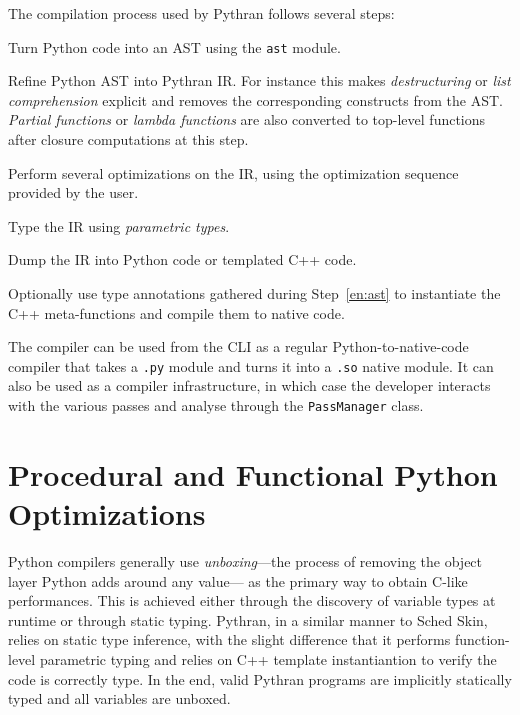\documentclass{llncs}
\begin{document}
The compilation process used by Pythran follows several steps:
\begin{inparaenum}[1)]
\item\label{en:ast} Turn Python code into an \ac{AST} using the \texttt{ast}
    module.
\item Refine Python \ac{AST} into Pythran \ac{IR}. For instance this makes
    \emph{destructuring} or \emph{list comprehension} explicit and removes the
    corresponding constructs from the \ac{AST}. \emph{Partial functions} or
    \emph{lambda functions} are also converted to top-level functions after
    closure computations at this step.
\item Perform several optimizations on the \ac{IR}, using the optimization
    sequence provided by the user.
\item Type the \ac{IR} using \emph{parametric types}.
\item Dump the \ac{IR} into Python code or templated C++ code.
\item Optionally use type annotations gathered during Step~\ref{en:ast} to
    instantiate the C++ meta-functions and compile them to native code.
\end{inparaenum}

The compiler can be used from the \ac{CLI} as a regular Python-to-native-code
compiler that takes a \texttt{.py} module and turns it into a \texttt{.so}
native module. It can also be used as a compiler infrastructure, in which case
the developer interacts with the various passes and analyse through the
\texttt{PassManager} class.

\section{Procedural and Functional Python Optimizations}
\label{sec:functionnal-optim}

Python compilers generally use \emph{unboxing}---the process of removing the
object layer Python adds around any value--- as the primary way to obtain
C-like performances. This is achieved either through the discovery of variable
types at runtime or through static typing. Pythran, in a similar manner to
Sched Skin, relies on static type inference, with the slight difference that it
performs function-level parametric typing and relies on C++ template
instantiantion to verify the code is correctly type. In the end, valid Pythran
programs are implicitly statically typed and all variables are unboxed.
\end{document}

